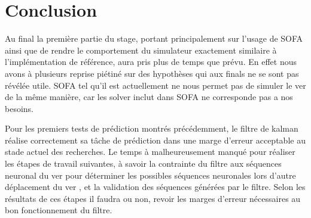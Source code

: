 \chapter{Conclusion} %
\label{cha:Conclusion}

Au final la première partie du stage, portant principalement sur l'usage de
SOFA ainsi que de rendre le comportement du simulateur exactement similaire à
l'implémentation de référence, aura pris plus de temps que prévu. En effet
nous avons à plusieurs reprise piétiné sur des hypothèses qui aux finals ne se sont pas
révélée utile. SOFA tel qu'il est actuellement ne nous permet pas de simuler
le ver de la même manière, car les solver inclut dans SOFA ne corresponde pas
a nos besoins. 

Pour les premiers tests de prédiction montrés précédemment, le filtre de kalman
réalise correctement sa tâche de prédiction dans une marge d'erreur acceptable
au stade actuel des recherches. Le temps à malheureusement manqué pour réaliser
les étapes de travail suivantes, à savoir la contrainte du filtre aux séquences
neuronal du ver pour déterminer les possibles séquences neuronales lors d'autre
déplacement du ver , et la validation des séquences générées par le filtre.
Selon les résultats de ces étapes il faudra ou non, revoir les marges d'erreur
nécessaires au bon fonctionnement du filtre.

